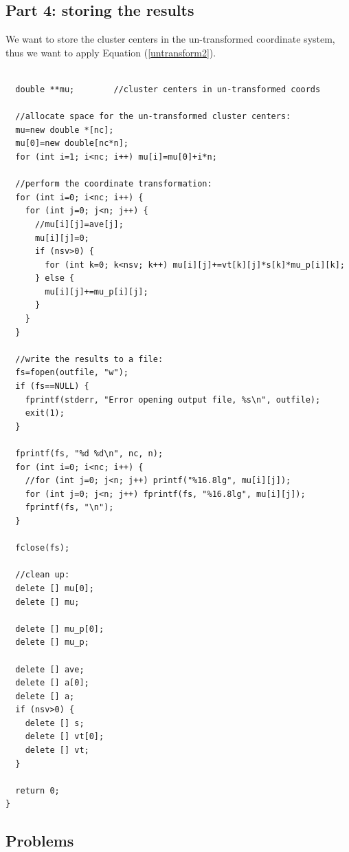 \documentclass{article}
\begin{document}
\subsection{Part 4: storing the results}

We want to store the cluster centers in the un-transformed coordinate system,
thus we want to apply Equation (\ref{untransform2}).

\begin{verbatim}

  double **mu;        //cluster centers in un-transformed coords

  //allocate space for the un-transformed cluster centers:
  mu=new double *[nc];
  mu[0]=new double[nc*n];
  for (int i=1; i<nc; i++) mu[i]=mu[0]+i*n;

  //perform the coordinate transformation:
  for (int i=0; i<nc; i++) {
    for (int j=0; j<n; j++) {
      //mu[i][j]=ave[j];
      mu[i][j]=0;
      if (nsv>0) {
        for (int k=0; k<nsv; k++) mu[i][j]+=vt[k][j]*s[k]*mu_p[i][k];
      } else {
        mu[i][j]+=mu_p[i][j];
      }
    }
  }

  //write the results to a file:
  fs=fopen(outfile, "w");
  if (fs==NULL) {
    fprintf(stderr, "Error opening output file, %s\n", outfile);
    exit(1);
  }

  fprintf(fs, "%d %d\n", nc, n);
  for (int i=0; i<nc; i++) {
    //for (int j=0; j<n; j++) printf("%16.8lg", mu[i][j]);
    for (int j=0; j<n; j++) fprintf(fs, "%16.8lg", mu[i][j]);
    fprintf(fs, "\n");
  }

  fclose(fs);

  //clean up:
  delete [] mu[0];
  delete [] mu;

  delete [] mu_p[0];
  delete [] mu_p;

  delete [] ave;
  delete [] a[0];
  delete [] a;
  if (nsv>0) {
    delete [] s;
    delete [] vt[0];
    delete [] vt;
  }

  return 0;
}

\end{verbatim}

\subsection{Problems}
\end{document}
